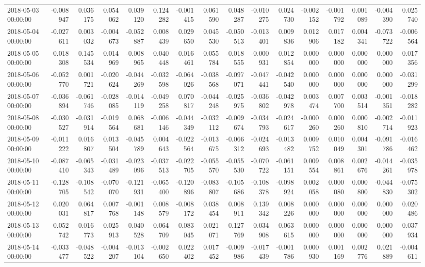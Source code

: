 \begin{tabular}{lrrrrrrrrrrrrrrr}
2018-05-03 00:00:00 & -0.008947 & 0.036175 & 0.054062 & 0.039120 & 0.124282 & -0.001415 & 0.061590 & 0.048287 & -0.010275 & 0.024730 & -0.002152 & -0.001792 & 0.001089 & -0.004390 & 0.025740 \\
2018-05-04 00:00:00 & -0.027611 & 0.003032 & -0.004673 & -0.052887 & 0.008439 & 0.029650 & 0.045530 & -0.050513 & -0.013401 & 0.009836 & 0.012906 & 0.017182 & 0.004341 & -0.073722 & -0.006564 \\
2018-05-05 00:00:00 & 0.018308 & 0.145534 & 0.014969 & -0.008965 & 0.040448 & -0.016461 & 0.055784 & -0.018555 & -0.000931 & 0.012854 & 0.000000 & 0.000000 & 0.000000 & 0.000000 & 0.017356 \\
2018-05-06 00:00:00 & -0.052770 & 0.001721 & -0.020624 & -0.044269 & -0.032598 & -0.064026 & -0.038568 & -0.097071 & -0.047441 & -0.042540 & 0.000000 & 0.000000 & 0.000000 & 0.000000 & -0.031299 \\
2018-05-07 00:00:00 & -0.036894 & -0.061746 & -0.028085 & -0.014119 & -0.049258 & 0.070817 & -0.044248 & -0.025975 & -0.036802 & -0.042978 & 0.003474 & 0.007700 & 0.003514 & -0.001351 & -0.018282 \\
2018-05-08 00:00:00 & -0.030527 & -0.031914 & -0.019564 & 0.068681 & -0.006146 & -0.044349 & -0.032112 & -0.009674 & -0.034793 & -0.024617 & -0.000260 & 0.000260 & 0.000810 & -0.002714 & -0.011923 \\
2018-05-09 00:00:00 & -0.011222 & 0.016807 & 0.013504 & -0.045789 & 0.004643 & -0.022564 & -0.013675 & -0.066312 & -0.024693 & -0.013482 & 0.009752 & 0.010049 & 0.004301 & -0.091786 & -0.016462 \\
2018-05-10 00:00:00 & -0.087410 & -0.065343 & -0.031489 & -0.023096 & -0.037513 & -0.022705 & -0.055570 & -0.055530 & -0.070722 & -0.061151 & 0.009554 & 0.008861 & 0.002676 & -0.014261 & -0.035978 \\
2018-05-11 00:00:00 & -0.128705 & -0.108542 & -0.070070 & -0.121931 & -0.065400 & -0.120896 & -0.083807 & -0.105686 & -0.108378 & -0.098924 & 0.002058 & 0.000080 & 0.000800 & -0.044830 & -0.075302 \\
2018-05-12 00:00:00 & 0.020031 & 0.064817 & 0.007768 & -0.001148 & 0.008579 & -0.008172 & 0.038454 & 0.008911 & 0.139342 & 0.008226 & 0.000000 & 0.000000 & 0.000000 & 0.000000 & 0.020486 \\
2018-05-13 00:00:00 & 0.052742 & 0.016773 & 0.025913 & 0.040528 & 0.064709 & 0.083045 & 0.021071 & 0.127769 & 0.034908 & 0.063615 & 0.000000 & 0.000000 & 0.000000 & 0.000000 & 0.037934 \\
2018-05-14 00:00:00 & -0.033477 & -0.048522 & -0.004207 & -0.013104 & -0.002650 & 0.022402 & 0.017452 & -0.009986 & -0.017439 & -0.001786 & 0.000930 & 0.001169 & 0.002776 & 0.021889 & -0.004611 \\

\end{tabular}
